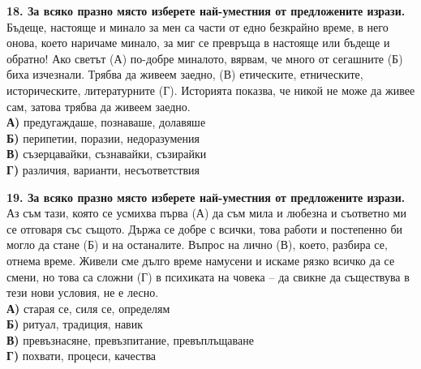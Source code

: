 \documentclass[12pt,a4paper]{article}
\begin{document}
\noindent
\textbf{18. За всяко празно място изберете най-уместния от предложените изрази.} \\
\noindent
Бъдеще, настояще и минало за мен са части от едно безкрайно време, в него онова, което наричаме минало, за миг се превръща в настояще или бъдеще и обратно! Ако светът \makebox[2cm]{\dotfill} (А) по-добре миналото, вярвам, че много от сегашните \makebox[2cm]{\dotfill} (Б) биха изчезнали. Трябва да живеем заедно, \makebox[2cm]{\dotfill} (В) етическите, етническите, историческите, литературните \makebox[2cm]{\dotfill} (Г). Историята показва, че никой не може да живее сам, затова трябва да живеем заедно. \\
\noindent
\textbf{А)} предугаждаше, познаваше, долавяше \\
\textbf{Б)} перипетии, поразии, недоразумения \\
\textbf{В)} съзерцавайки, съзнавайки, съзирайки \\
\textbf{Г)} различия, варианти, несъответствия

\vspace{0.6cm}

\noindent
\textbf{19. За всяко празно място изберете най-уместния от предложените изрази.} \\
\noindent
Аз съм тази, която се усмихва първа \makebox[2cm]{\dotfill} (А) да съм мила и любезна и съответно ми се отговаря със същото. Държа се добре с всички, това работи и постепенно би могло да стане \makebox[2cm]{\dotfill} (Б) и на останалите. Въпрос на лично \makebox[2cm]{\dotfill} (В), което, разбира се, отнема време. Живели сме дълго време намусени и искаме рязко всичко да се смени, но това са сложни \makebox[2cm]{\dotfill} (Г) в психиката на човека – да свикне да съществува в тези нови условия, не е лесно. \\
\noindent
\textbf{А)} старая се, силя се, определям \\
\textbf{Б)} ритуал, традиция, навик \\
\textbf{В)} превъзнасяне, превъзпитание, превъплъщаване \\
\textbf{Г)} похвати, процеси, качества

\vspace{0.6cm}
\end{document}
